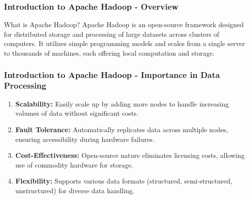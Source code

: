 \documentclass[aspectratio=169]{beamer}
\begin{document}
\frame{\titlepage}

\begin{frame}[fragile]
    \frametitle{Introduction to Apache Hadoop - Overview}
    \begin{block}{What is Apache Hadoop?}
        Apache Hadoop is an open-source framework designed for distributed storage and processing of large datasets across clusters of computers. 
        It utilizes simple programming models and scales from a single server to thousands of machines, each offering local computation and storage.
    \end{block}
\end{frame}

\begin{frame}[fragile]
    \frametitle{Introduction to Apache Hadoop - Importance in Data Processing}
    \begin{enumerate}
        \item \textbf{Scalability:} Easily scale up by adding more nodes to handle increasing volumes of data without significant costs.
        \item \textbf{Fault Tolerance:} Automatically replicates data across multiple nodes, ensuring accessibility during hardware failures.
        \item \textbf{Cost-Effectiveness:} Open-source nature eliminates licensing costs, allowing use of commodity hardware for storage.
        \item \textbf{Flexibility:} Supports various data formats (structured, semi-structured, unstructured) for diverse data handling.
    \end{enumerate}
\end{frame}
\end{document}
